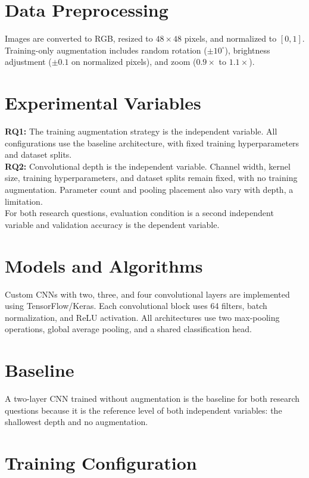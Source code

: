 \documentclass[11pt,letterpaper]{article}
\begin{document}
\section*{Data Preprocessing}
Images are converted to RGB, resized to $48 \times 48$ pixels, and normalized to $[0,1]$. 
Training-only augmentation includes random rotation ($\pm 10^\circ$), brightness adjustment ($\pm 0.1$ on normalized pixels), and zoom ($0.9\times$ to $1.1\times$). 

\section*{Experimental Variables}

\noindent\textbf{RQ1:}
The training augmentation strategy is the independent variable.
All configurations use the baseline architecture, with fixed training hyperparameters and dataset splits.\\

\noindent\textbf{RQ2:}
Convolutional depth is the independent variable.
Channel width, kernel size, training hyperparameters, and dataset splits remain fixed, with no training augmentation.
Parameter count and pooling placement also vary with depth, a limitation.\\

\noindent For both research questions, evaluation condition is a second independent variable and validation accuracy is the dependent variable.

\clearpage

\section*{Models and Algorithms}
Custom CNNs with two, three, and four convolutional layers are implemented using TensorFlow/Keras.
Each convolutional block uses 64 filters, batch normalization, and ReLU activation.
All architectures use two max-pooling operations, global average pooling, and a shared classification head.

\section*{Baseline}

A two-layer CNN trained without augmentation is the baseline for both research questions because it is the reference level of both independent variables: the shallowest depth and no augmentation.

\section*{Training Configuration}
\end{document}
